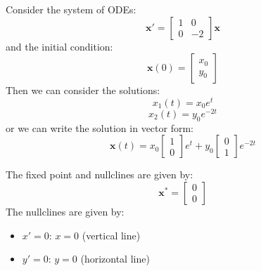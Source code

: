 \documentclass[11pt]{article}
\begin{document}
\begin{example}
    Consider the system of ODEs:
    $$
    \textbf{x}' = \begin{bmatrix} 1 & 0 \\ 0 & -2
    \end{bmatrix}\textbf{x} 
    $$
    and the initial condition:
    $$
    \textbf{x}(0) = \begin{bmatrix} x_0 \\ y_0
    \end{bmatrix}
    $$
    Then we can consider the solutions:
    $$x_1(t) = x_0 e^{t}$$
    $$x_2(t) = y_0 e^{-2t}$$
    or we can write the solution in vector form:
    $$\textbf{x}(t) = x_0 \begin{bmatrix}
        1 \\ 0
    \end{bmatrix} e^{t} + y_0 \begin{bmatrix}
        0 \\ 1
    \end{bmatrix} e^{-2t}
    $$

    The fixed point and nullclines are given by:
    $$\textbf{x}^* = \begin{bmatrix}0 \\ 0
    \end{bmatrix}$$
    The nullclines are given by:
    \begin{itemize}
        \item \( x' = 0 \): \( x = 0 \) (vertical line)
        \item \( y' = 0 \): \( y = 0 \) (horizontal line)
    \end{itemize}
    

\end{example}
\end{document}
